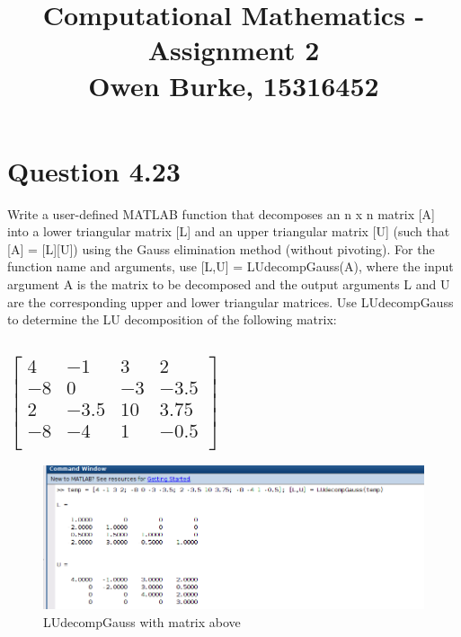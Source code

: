 \documentclass{report}
\title{\textbf{Computational Mathematics - Assignment 2}\\Owen Burke, 15316452}
\begin{document}







    \maketitle
    \section*{\hfil Question 4.23 \hfil}
    Write a user-defined MATLAB function that decomposes an n x n matrix [A] into a lower triangular matrix [L] and an upper triangular matrix [U] (such that [A] = [L][U]) using the 
    Gauss elimination method (without pivoting). For the function name and arguments, use [L,U] = LUdecompGauss(A), where the input argument A is the matrix to be decomposed and the output 
    arguments L and U are the cor­responding upper and lower triangular matrices. Use LUdecompGauss to determine the LU decomposi­tion of the following matrix: 
    
		\subsection*{$\begin{bmatrix}
            4 & -1 & 3 & 2\\
            -8 & 0 & -3 & -3.5\\
            2 & -3.5 & 10 & 3.75\\
            -8 & -4 & 1 & -0.5\\
        \end{bmatrix}$}
                  
        

        \begin{figure}[h!]
            \includegraphics[width=\linewidth]{LUdecompPic.png}
            \caption{LUdecompGauss with matrix above}
            \label{fig:LUdecompPic}
        \end{figure}
\end{document}
